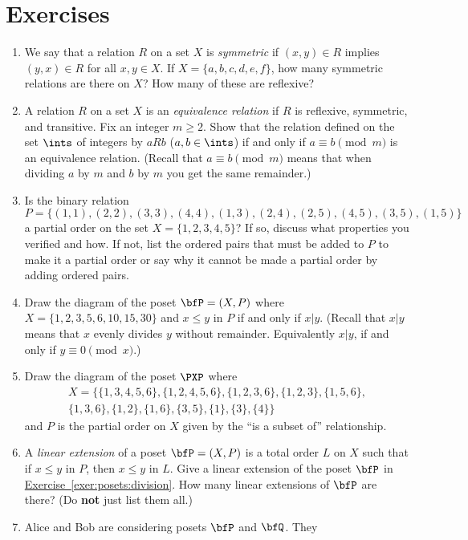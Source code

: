 \section{Exercises}

\begin{enumerate}
\item We say that a relation $R$ on a set $X$ is \textit{symmetric} if
  $(x,y)\in R$ implies $(y,x)\in R$ for all $x,y\in X$. If
  $X=\{a,b,c,d,e,f\}$, how many symmetric relations are there on $X$?
  How many of these are reflexive?
\item A relation $R$ on a set $X$ is an \textit{equivalence relation}
  if $R$ is reflexive, symmetric, and transitive. Fix an integer
  $m\geq 2$. Show that the relation defined on the set
  $\ints$ of integers by $aRb$ ($a,b\in\ints$) if and only if $a\equiv
  b\pmod{m}$ is an equivalence relation. (Recall that $a\equiv
  b\pmod{m}$ means that when dividing $a$ by $m$ and $b$ by $m$ you
  get the same remainder.)
\item Is the binary relation \[P=\{(1,1),(2,2),(3,3),(4,4),(1,3),(2,4),(2,5),(4,5),(3,5),(1,5)\}\] a partial
  order on the set $X=\{1,2,3,4,5\}$? If so, discuss what properties
  you verified and how. If not, list the ordered pairs that must be
  added to $P$ to make it a partial order or say why it cannot be made
  a partial order by adding ordered pairs.
\item Draw the diagram of the poset $\bfP=(X,P)$ where
  $X=\{1,2,3,5,6,10,15,30\}$ and $x\leq y$ in $P$ if and only if
  $x|y$. (Recall that $x|y$ means that $x$ evenly divides $y$ without
  remainder. Equivalently $x|y$, if and only if $y\equiv
  0\pmod{x}$.) \label{exer:posets:division}
\item Draw the diagram of the poset $\PXP$ where
 \begin{multline*}
    X=\{\{1,3,4,5,6\},\{1,2,4,5,6\},\{1,2,3,6\},\{1,2,3\},\{1,5,6\},\\\{1,3,6\},\{1,2\},\{1,6\},\{3,5\},\{1\},\{3\},\{4\}\}
  \end{multline*}
 and $P$ is the partial order on $X$ given by the ``is a subset of''
 relationship.
\item A \textit{linear extension} of a poset $\bfP=(X,P)$ is a total
  order $L$ on $X$ such that if $x\leq y$ in $P$, then $x\leq y$ in $L$. Give a
  linear extension of the poset $\bfP$ in
  \hyperref[exer:posets:division]{Exercise~\ref*{exer:posets:division}}. How
  many linear extensions of $\bfP$ are there? (Do \textbf{not} just
  list them all.)
\item Alice and Bob are considering posets $\bfP$ and $\bfQ$. They

\end{enumerate}
